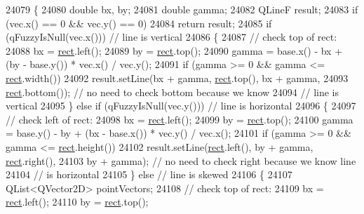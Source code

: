 \begin{DoxyCode}
24079                                                                           \{
24080   \textcolor{keywordtype}{double} bx, by;
24081   \textcolor{keywordtype}{double} gamma;
24082   QLineF result;
24083   \textcolor{keywordflow}{if} (vec.x() == 0 && vec.y() == 0)
24084     \textcolor{keywordflow}{return} result;
24085   \textcolor{keywordflow}{if} (qFuzzyIsNull(vec.x())) \textcolor{comment}{// line is vertical}
24086   \{
24087     \textcolor{comment}{// check top of rect:}
24088     bx = \hyperlink{_gen_blob_8m_aea8f6815d9a63491fc422c5572c6b3c3}{rect}.left();
24089     by = \hyperlink{_gen_blob_8m_aea8f6815d9a63491fc422c5572c6b3c3}{rect}.top();
24090     gamma = base.x() - bx + (by - base.y()) * vec.x() / vec.y();
24091     \textcolor{keywordflow}{if} (gamma >= 0 && gamma <= \hyperlink{_gen_blob_8m_aea8f6815d9a63491fc422c5572c6b3c3}{rect}.width())
24092       result.setLine(bx + gamma, \hyperlink{_gen_blob_8m_aea8f6815d9a63491fc422c5572c6b3c3}{rect}.top(), bx + gamma,
24093                      \hyperlink{_gen_blob_8m_aea8f6815d9a63491fc422c5572c6b3c3}{rect}.bottom()); \textcolor{comment}{// no need to check bottom because we know}
24094                                      \textcolor{comment}{// line is vertical}
24095   \} \textcolor{keywordflow}{else} \textcolor{keywordflow}{if} (qFuzzyIsNull(vec.y()))  \textcolor{comment}{// line is horizontal}
24096   \{
24097     \textcolor{comment}{// check left of rect:}
24098     bx = \hyperlink{_gen_blob_8m_aea8f6815d9a63491fc422c5572c6b3c3}{rect}.left();
24099     by = \hyperlink{_gen_blob_8m_aea8f6815d9a63491fc422c5572c6b3c3}{rect}.top();
24100     gamma = base.y() - by + (bx - base.x()) * vec.y() / vec.x();
24101     \textcolor{keywordflow}{if} (gamma >= 0 && gamma <= \hyperlink{_gen_blob_8m_aea8f6815d9a63491fc422c5572c6b3c3}{rect}.height())
24102       result.setLine(\hyperlink{_gen_blob_8m_aea8f6815d9a63491fc422c5572c6b3c3}{rect}.left(), by + gamma, \hyperlink{_gen_blob_8m_aea8f6815d9a63491fc422c5572c6b3c3}{rect}.right(),
24103                      by + gamma); \textcolor{comment}{// no need to check right because we know line}
24104                                   \textcolor{comment}{// is horizontal}
24105   \} \textcolor{keywordflow}{else}                          \textcolor{comment}{// line is skewed}
24106   \{
24107     QList<QVector2D> pointVectors;
24108     \textcolor{comment}{// check top of rect:}
24109     bx = \hyperlink{_gen_blob_8m_aea8f6815d9a63491fc422c5572c6b3c3}{rect}.left();
24110     by = \hyperlink{_gen_blob_8m_aea8f6815d9a63491fc422c5572c6b3c3}{rect}.top();

\end{DoxyCode}
